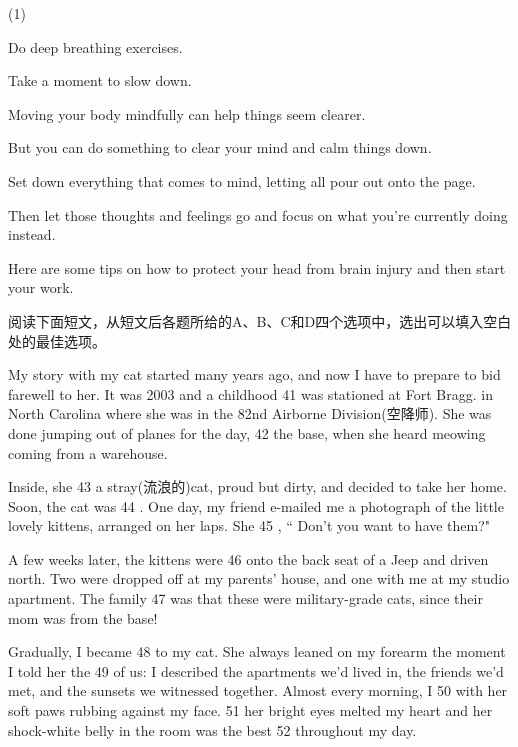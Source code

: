 \documentclass{英语试卷}
\begin{document}
\begin{choices}(1)
  \item Do deep breathing exercises.
  \item Take a moment to slow down.
  \item Moving your body mindfully can help things seem clearer.
  \item But you can do something to clear your mind and calm things down.
  \item Set down everything that comes to mind, letting all pour out onto the page.
  \item Then let those thoughts and feelings go and focus on what you're currently doing instead.
  \item Here are some tips on how to protect your head from brain injury and then start your work.
\end{choices}
\par 阅读下面短文，从短文后各题所给的A、B、C和D四个选项中，选出可以填入空白处的最佳选项。\par
\par My story with my cat started many years ago, and now I have to prepare to bid farewell to her. It was 2003 and a childhood 41 was stationed at Fort Bragg. in North Carolina where she was in the 82nd Airborne Division(空降师). She was done jumping out of planes for the day, 42 the base, when she heard meowing coming from a warehouse.\par
\par Inside, she 43 a stray(流浪的)cat, proud but dirty, and decided to take her home. Soon, the cat was 44 . One day, my friend e-mailed me a photograph of the little lovely kittens, arranged on her laps. She 45 , “ Don't you want to have them?"\par
\par A few weeks later, the kittens were 46 onto the back seat of a Jeep and driven north. Two were dropped off at my parents' house, and one with me at my studio apartment. The family 47 was that these were military-grade cats, since their mom was from the base!\par
\par Gradually, I became 48 to my cat. She always leaned on my forearm the moment I told her the 49 of us: I described the apartments we'd lived in, the friends we'd met, and the sunsets we witnessed together. Almost every morning, I 50 with her soft paws rubbing against my face. 51 her bright eyes melted my heart and her shock-white belly in the room was the best 52 throughout my day.\par
\end{document}

